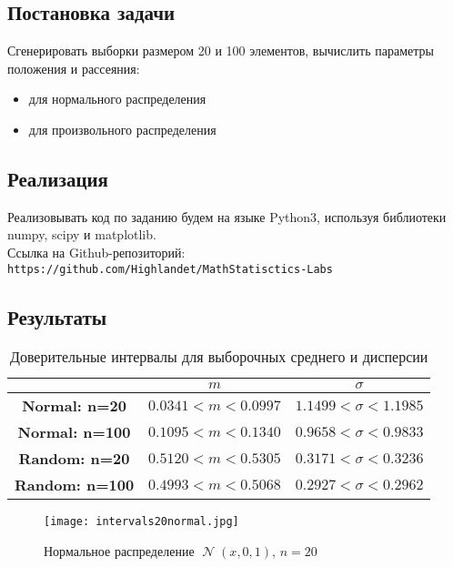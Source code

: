\documentclass[14pt]{extarticle}
\DeclareMathOperator{\normal}{\mathcal{N}} %
\begin{document}
\subsection{Постановка задачи}

Сгенерировать выборки размером 20 и 100 элементов, вычислить параметры положения и рассеяния:
\begin{itemize}
    \item для нормального распределения 
    \item для произвольного распределения
\end{itemize}

\subsection{Реализация}
Реализовывать код по заданию будем на языке Python3, используя библиотеки numpy, scipy и matplotlib.\\
Ссылка на Github-репозиторий: \\
\texttt{https://github.com/Highlandet/MathStatisctics-Labs}

\subsection{Результаты}

\begin{table}[htbp]
    \centering
    \begin{tabular}{|c|c|c|}
        \toprule
         & \(m\) & \(\sigma\)\\
        \toprule
        \textbf{Normal: n=20} & \(0.0341 < m < 0.0997\) & \(1.1499 < \sigma < 1.1985\)\\ 
        \midrule
  	\textbf{Normal: n=100} & \(0.1095 < m < 0.1340\) & \(0.9658 < \sigma < 0.9833\)\\
        \toprule
        \textbf{Random: n=20} & \(0.5120 < m < 0.5305\) & \(0.3171 < \sigma < 0.3236\)\\
        \midrule
        \textbf{Random: n=100} & \(0.4993 < m < 0.5068\) & \(0.2927 < \sigma < 0.2962\)\\
        \toprule
    \end{tabular}
    \caption{Доверительные интервалы для выборочных среднего и дисперсии}
    \label{tab:mus_n_sigmas}
\end{table}

\begin{figure}[H]
    \centering
    \texttt{[image: intervals20normal.jpg]}
    \caption{Нормальное распределение \(\normal(x, 0, 1)\), \(n=20\)}
    \label{fig:enter-label}
\end{figure}
\end{document}
